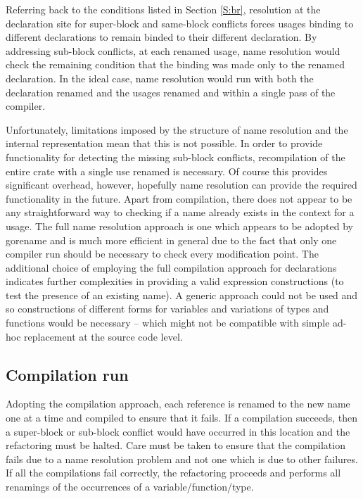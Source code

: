 Referring back to the conditions listed in Section \ref{S:br}, resolution at the declaration site for super-block and same-block conflicts forces usages binding to different declarations to remain binded to their different declaration. By addressing sub-block conflicts, at each renamed usage, name resolution would check the remaining condition that the binding was made only to the renamed declaration. In the ideal case, name resolution would run with both the declaration renamed and the usages renamed and within a single pass of the compiler.

Unfortunately, limitations imposed by the structure of name resolution and the internal representation mean that this is not possible. In order to provide functionality for detecting the missing sub-block conflicts, recompilation of the entire crate with a single use renamed is necessary. Of course this provides significant overhead, however, hopefully name resolution can provide the required functionality in the future. Apart from compilation, there does not appear to be any straightforward way to checking if a name already exists in the context for a usage. The full name resolution approach is one which appears to be adopted by gorename \cite{gorename15} and is much more efficient in general due to the fact that only one compiler run should be necessary to check every modification point. The additional choice of employing the full compilation approach for declarations indicates further complexities in providing a valid expression constructions (to test the presence of an existing name). A generic approach could not be used and so constructions of different forms for variables and variations of types and functions would be necessary -- which might not be compatible with simple ad-hoc replacement at the source code level.

\subsection{Compilation run}
Adopting the compilation approach, each reference is renamed to the new name one at a time and compiled to ensure that it fails. If a compilation succeeds, then a super-block or sub-block conflict would have occurred in this location and the refactoring must be halted. Care must be taken to ensure that the compilation fails due to a name resolution problem and not one which is due to other failures. If all the compilations fail correctly, the refactoring proceeds and performs all renamings of the occurrences of a variable/function/type.

